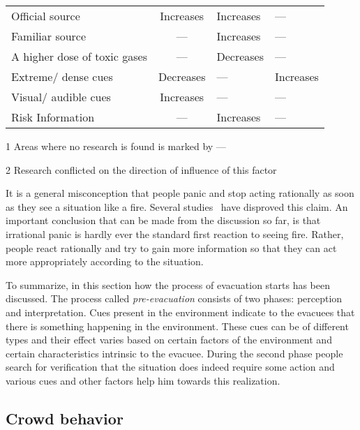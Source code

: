 \begin{table}[htbp]
\begin{threeparttable}[b]
\begin{tabular}{m{6.3cm} c >{\centering\arraybackslash}m{2.8cm} >{\centering\arraybackslash}m{2.8cm}}
Official source & Increases & Increases &---\\
Familiar source & --- & Increases &--- \\
A higher dose of toxic gases & --- & Decreases & --- \\
Extreme/ dense cues & Decreases & --- & Increases \\
Visual/ audible cues & Increases & --- & --- \\
Risk Information & --- & Increases & --- \\
\bottomrule
\end{tabular}
\begin{tablenotes}
\item[1]{Areas where no research is found is marked by ---}
\item[2]{Research conflicted on the direction of influence of this factor}
\end{tablenotes}
\label{tab:Cues}
\end{threeparttable}
\end{table}

It is a general misconception that people panic and stop acting rationally as soon as they see a situation like a fire. Several studies~\cite{Kobes:2009jx,Schadschneider:2008cz,Reicher:2008ep,Torres:2010tj,Paulsen:1984ti,Sime:1983uy} have disproved this claim. An important conclusion that can be made from the discussion so far, is that irrational panic is hardly ever the standard first reaction to seeing fire. Rather, people react rationally and try to gain more information so that they can act more appropriately according to the situation.

To summarize, in this section how the process of evacuation starts has been discussed. The process called \emph{pre-evacuation} consists of two phases: perception and interpretation. Cues present in the environment indicate to the evacuees that there is something happening in the environment. These cues can be of different types and their effect varies based on certain factors of the environment and certain characteristics intrinsic to the evacuee. During the second phase people search for verification that the situation does indeed require some action and various cues and other factors help him towards this realization.  %

\subsection{Crowd behavior}
\label{LiteratureReview:CrowdBehavior}

